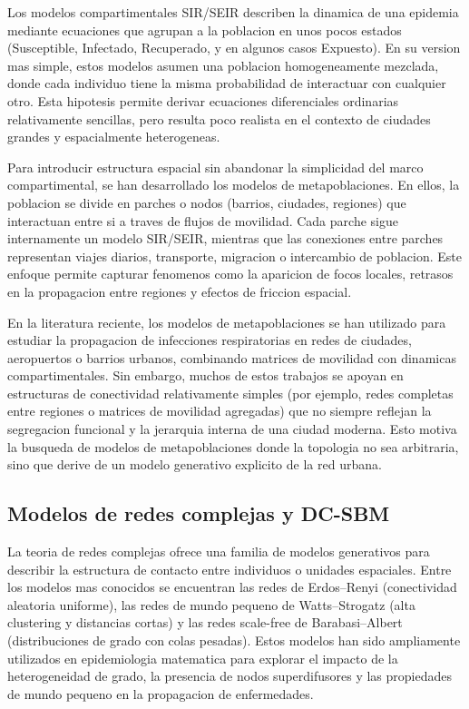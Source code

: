 Los modelos compartimentales SIR/SEIR describen la dinamica de una epidemia mediante ecuaciones que agrupan a la poblacion en unos pocos estados (Susceptible, Infectado, Recuperado, y en algunos casos Expuesto). 
En su version mas simple, estos modelos asumen una poblacion homogeneamente mezclada, donde cada individuo tiene la misma probabilidad de interactuar con cualquier otro. 
Esta hipotesis permite derivar ecuaciones diferenciales ordinarias relativamente sencillas, pero resulta poco realista en el contexto de ciudades grandes y espacialmente heterogeneas.

Para introducir estructura espacial sin abandonar la simplicidad del marco compartimental, se han desarrollado los modelos de metapoblaciones. 
En ellos, la poblacion se divide en parches o nodos (barrios, ciudades, regiones) que interactuan entre si a traves de flujos de movilidad. 
Cada parche sigue internamente un modelo SIR/SEIR, mientras que las conexiones entre parches representan viajes diarios, transporte, migracion o intercambio de poblacion. 
Este enfoque permite capturar fenomenos como la aparicion de focos locales, retrasos en la propagacion entre regiones y efectos de friccion espacial.

En la literatura reciente, los modelos de metapoblaciones se han utilizado para estudiar la propagacion de infecciones respiratorias en redes de ciudades, aeropuertos o barrios urbanos, combinando matrices de movilidad con dinamicas compartimentales. 
Sin embargo, muchos de estos trabajos se apoyan en estructuras de conectividad relativamente simples (por ejemplo, redes completas entre regiones o matrices de movilidad agregadas) que no siempre reflejan la segregacion funcional y la jerarquia interna de una ciudad moderna. 
Esto motiva la busqueda de modelos de metapoblaciones donde la topologia no sea arbitraria, sino que derive de un modelo generativo explicito de la red urbana.

\subsection{Modelos de redes complejas y DC-SBM}

La teoria de redes complejas ofrece una familia de modelos generativos para describir la estructura de contacto entre individuos o unidades espaciales. 
Entre los modelos mas conocidos se encuentran las redes de Erdos–Renyi (conectividad aleatoria uniforme), las redes de mundo pequeno de Watts–Strogatz (alta clustering y distancias cortas) y las redes scale-free de Barabasi–Albert (distribuciones de grado con colas pesadas). 
Estos modelos han sido ampliamente utilizados en epidemiologia matematica para explorar el impacto de la heterogeneidad de grado, la presencia de nodos superdifusores y las propiedades de mundo pequeno en la propagacion de enfermedades.

